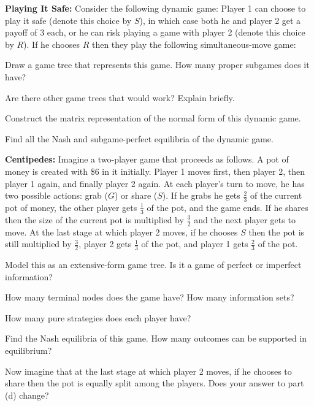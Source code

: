 \textbf{Playing It Safe:} Consider the following dynamic game: Player 1 can choose to play
it safe (denote this choice by $S$), in which case both he and player 2 get a payoff of 3 each, or he
can risk playing a game with player 2 (denote this choice by $R$). If he chooses $R$ then they play
the following simultaneous-move game:
\begin{partes}
\item Draw a game tree that represents this game. How many proper subgames does it have?
\item Are there other game trees that would work? Explain briefly.
\item Construct the matrix representation of the normal form of this dynamic game.
\item Find all the Nash and subgame-perfect equilibria of the dynamic game.
\end{partes}
\resolespaco


\textbf{Centipedes:} Imagine a two-player game that proceeds as follows. A pot of money is
created with \$6 in it initially. Player 1 moves first, then player 2, then player 1 again, and
finally player 2 again. At each player's turn to move, he has two possible actions: grab ($G$) or
share ($S$). If he grabs he gets $\frac{2}{3}$ of the current pot of money, the other player gets
$\frac{1}{3}$ of the pot, and the game ends. If he shares then the size of the current pot is
multiplied by $\frac{3}{2}$ and the next player gets to move. At the last stage at which player 2
moves, if he chooses $S$ then the pot is still multiplied by $\frac{3}{2}$, player 2 gets
$\frac{1}{3}$ of the pot, and player 1 gets $\frac{2}{3}$ of the pot.
\begin{partes}
\item Model this as an extensive-form game tree. Is it a game of perfect or imperfect information?
\item How many terminal nodes does the game have? How many information sets?
\item How many pure strategies does each player have?
\item Find the Nash equilibria of this game. How many outcomes can be supported in equilibrium?
\item Now imagine that at the last stage at which player 2 moves, if he chooses to share then the
pot is equally split among the players. Does your answer to part (d) change?
\end{partes}
\resolespaco

